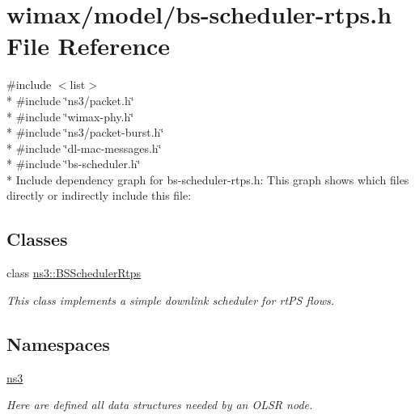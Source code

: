 \hypertarget{bs-scheduler-rtps_8h}{}\section{wimax/model/bs-\/scheduler-\/rtps.h File Reference}
\label{bs-scheduler-rtps_8h}
{\ttfamily \#include $<$list$>$}\\*
{\ttfamily \#include \char`\"{}ns3/packet.\+h\char`\"{}}\\*
{\ttfamily \#include \char`\"{}wimax-\/phy.\+h\char`\"{}}\\*
{\ttfamily \#include \char`\"{}ns3/packet-\/burst.\+h\char`\"{}}\\*
{\ttfamily \#include \char`\"{}dl-\/mac-\/messages.\+h\char`\"{}}\\*
{\ttfamily \#include \char`\"{}bs-\/scheduler.\+h\char`\"{}}\\*
Include dependency graph for bs-\/scheduler-\/rtps.h\+:
This graph shows which files directly or indirectly include this file\+:
\subsection*{Classes}
\begin{DoxyCompactItemize}
\item 
class \hyperlink{classns3_1_1BSSchedulerRtps}{ns3\+::\+B\+S\+Scheduler\+Rtps}
\begin{DoxyCompactList}\small\item\em This class implements a simple downlink scheduler for rt\+PS flows. \end{DoxyCompactList}\end{DoxyCompactItemize}
\subsection*{Namespaces}
\begin{DoxyCompactItemize}
\item 
 \hyperlink{namespacens3}{ns3}
\begin{DoxyCompactList}\small\item\em Here are defined all data structures needed by an O\+L\+SR node. \end{DoxyCompactList}\end{DoxyCompactItemize}
